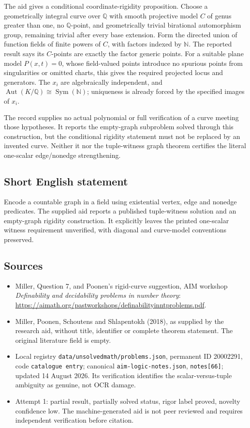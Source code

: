 \documentclass[11pt]{article}
\newcommand{\N}{\mathbb{N}}
\newcommand{\Q}{\mathbb{Q}}
\begin{document}
The aid gives a conditional coordinate-rigidity proposition. Choose a geometrically integral curve over \(\Q\) with smooth projective model \(C\) of genus greater than one, no \(\Q\)-point, and geometrically trivial birational automorphism group, remaining trivial after every base extension. Form the directed union of function fields of finite powers of \(C\), with factors indexed by \(\N\). The reported result says its \(C\)-points are exactly the factor generic points. For a suitable plane model \(P(x,t)=0\), whose field-valued points introduce no spurious points from singularities or omitted charts, this gives the required projected locus and generators. The \(x_i\) are algebraically independent, and \(\operatorname{Aut}(K/\Q)\cong\operatorname{Sym}(\N)\); uniqueness is already forced by the specified images of \(x_i\).

The record supplies no actual polynomial or full verification of a curve meeting those hypotheses. It reports the empty-graph subproblem solved through this construction, but the conditional rigidity statement must not be replaced by an invented curve. Neither it nor the tuple-witness graph theorem certifies the literal one-scalar edge/nonedge strengthening.
\subsection{Short English statement}
Encode a countable graph in a field using existential vertex, edge and nonedge predicates. The supplied aid reports a published tuple-witness solution and an empty-graph rigidity construction. It explicitly leaves the printed one-scalar witness requirement unverified, with diagonal and curve-model conventions preserved.
\subsection{Sources}
\begin{itemize}
\item Miller, Question 7, and Poonen's rigid-curve suggestion, AIM workshop \emph{Definability and decidability problems in number theory}: \url{https://aimath.org/pastworkshops/definabilityinntproblems.pdf}.
\item Miller, Poonen, Schoutens and Shlapentokh (2018), as supplied by the research aid, without title, identifier or complete theorem statement. The original literature field is empty.
\item Local registry \texttt{data/unsolvedmath/problems.json}, permanent ID 20002291, code \texttt{catalogue entry}; canonical \texttt{aim-logic-notes.json}, \texttt{notes[66]}; updated 14 August 2026. Its verification identifies the scalar-versus-tuple ambiguity as genuine, not OCR damage.
\item Attempt 1: partial result, partially solved status, rigor label proved, novelty confidence low. The machine-generated aid is not peer reviewed and requires independent verification before citation.
\end{itemize}
\end{document}
